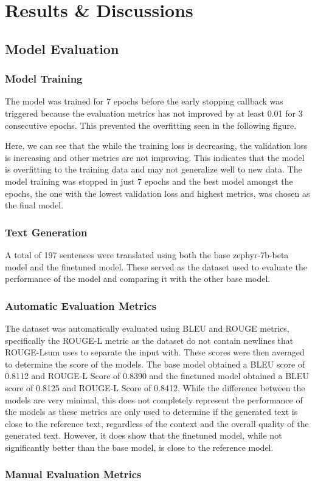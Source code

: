 \chapter{Results & Discussions}

\section{Model Evaluation}
\subsection{Model Training}
The model was trained for 7 epochs before the early stopping callback was triggered because the evaluation metrics has not improved by at least 0.01 for 3 consecutive epochs. This prevented the overfitting seen in the following figure. 

Here, we can see that the while the training loss is decreasing, the validation loss is increasing and other metrics are not improving. This indicates that the model is overfitting to the training data and may not generalize well to new data. The model training was stopped in just 7 epochs and the best model amongst the epochs, the one with the lowest validation loss and highest metrics, was chosen as the final model.

\subsection{Text Generation}
A total of 197 sentences were translated using both the base zephyr-7b-beta model and the finetuned model. These served as the dataset used to evaluate the performance of the model and comparing it with the other base model.

\subsection{Automatic Evaluation Metrics}
The dataset was automatically evaluated using BLEU and ROUGE metrics, specifically the ROUGE-L metric as the dataset do not contain newlines that ROUGE-Lsum uses to separate the input with. These scores were then averaged to determine the score of the models. The base model obtained a BLEU score of 0.8112 and ROUGE-L Score of 0.8390 and the finetuned model obtained a BLEU score of 0.8125 and ROUGE-L Score of 0.8412. While the difference between the models are very minimal, this does not completely represent the performance of the models as these metrics are only used to determine if the generated text is close to the reference text, regardless of the context and the overall quality of the generated text. However, it does show that the finetuned model, while not significantly better than the base model, is close to the reference model.

\subsection{Manual Evaluation Metrics}
